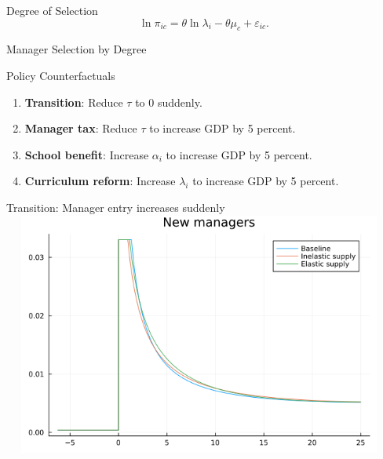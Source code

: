 \documentclass[
  ignorenonframetext,
  aspectratio=1610,
]{beamer}
\providecommand{\tightlist}{%
  \setlength{\itemsep}{0pt}\setlength{\parskip}{0pt}}
\begin{document}
\begin{frame}{Degree of Selection}
\protect\hypertarget{degree-of-selection}{}
\[
\ln \pi_{ic} = \theta\ln\lambda_i  - \theta \mu_c + \varepsilon_{ic}.
\]
\end{frame}

\begin{frame}{Manager Selection by Degree}
\protect\hypertarget{manager-selection-by-degree}{}

\end{frame}

\begin{frame}{Policy Counterfactuals}
\protect\hypertarget{policy-counterfactuals}{}
\begin{enumerate}
\tightlist
\item
  \textbf{Transition}: Reduce \(\tau\) to 0 suddenly.
\item
  \textbf{Manager tax}: Reduce \(\tau\) to increase GDP by 5 percent.
\item
  \textbf{School benefit}: Increase \(\alpha_i\) to increase GDP by 5
  percent.
\item
  \textbf{Curriculum reform}: Increase \(\lambda_i\) to increase GDP by
  5 percent.
\end{enumerate}
\end{frame}

\begin{frame}{Transition: Manager entry increases suddenly}
\protect\hypertarget{transition-manager-entry-increases-suddenly}{}
\includegraphics[width=13cm,height=8cm]{fig/model-entry-liberalization.png}
\end{frame}
\end{document}
